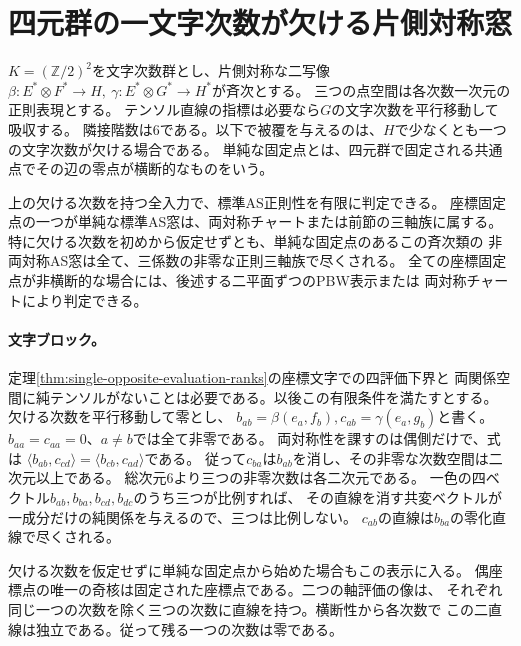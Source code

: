 \section{四元群の一文字次数が欠ける片側対称窓}
\label{sec:klein-companion-windows}
$K=(\mathbb Z/2)^2$を文字次数群とし、片側対称な二写像
$\beta:E^*\otimes F^*\to H,\ \gamma:E^*\otimes G^*\to H^*$が斉次とする。
三つの点空間は各次数一次元の正則表現とする。
テンソル直線の指標は必要なら$G$の文字次数を平行移動して吸収する。
隣接階数は6である。以下で被覆を与えるのは、$H$で少なくとも一つの文字次数が欠ける場合である。
単純な固定点とは、四元群で固定される共通点でその辺の零点が横断的なものをいう。

\begin{theorem}\label{thm:klein-missing-character}
上の欠ける次数を持つ全入力で、標準AS正則性を有限に判定できる。
座標固定点の一つが単純な標準AS窓は、両対称チャートまたは前節の三軸族に属する。
特に欠ける次数を初めから仮定せずとも、単純な固定点のあるこの斉次類の
非両対称AS窓は全て、三係数の非零な正則三軸族で尽くされる。
全ての座標固定点が非横断的な場合には、後述する二平面ずつのPBW表示または
両対称チャートにより判定できる。
\end{theorem}

\paragraph{文字ブロック。}
定理\ref{thm:single-opposite-evaluation-ranks}の座標文字での四評価下界と
両関係空間に純テンソルがないことは必要である。以後この有限条件を満たすとする。
欠ける次数を平行移動して零とし、
$b_{ab}=\beta(e_a,f_b), c_{ab}=\gamma(e_a,g_b)$と書く。
$b_{aa}=c_{aa}=0$、$a\ne b$では全て非零である。
両対称性を課すのは偶側だけで、式は
$\langle b_{ab},c_{cd}\rangle=\langle b_{cb},c_{ad}\rangle$である。
従って$c_{ba}$は$b_{ab}$を消し、その非零な次数空間は二次元以上である。
総次元6より三つの非零次数は各二次元である。
一色の四ベクトル$b_{ab},b_{ba},b_{cd},b_{dc}$のうち三つが比例すれば、
その直線を消す共変ベクトルが一成分だけの純関係を与えるので、三つは比例しない。
$c_{ab}$の直線は$b_{ba}$の零化直線で尽くされる。

欠ける次数を仮定せずに単純な固定点から始めた場合もこの表示に入る。
偶座標点の唯一の奇核は固定された座標点である。二つの軸評価の像は、
それぞれ同じ一つの次数を除く三つの次数に直線を持つ。横断性から各次数で
この二直線は独立である。従って残る一つの次数は零である。

